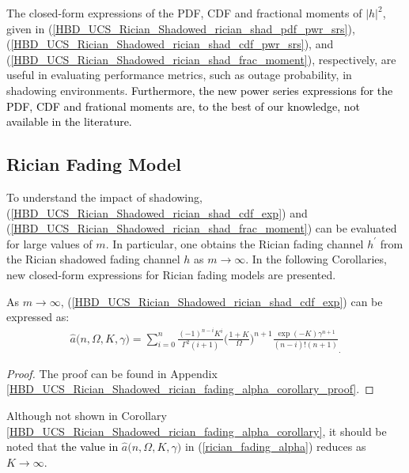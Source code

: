 The closed-form expressions of the PDF, CDF and fractional moments of $|h|^2$, given in (\ref{HBD_UCS_Rician_Shadowed_rician_shad_pdf_pwr_srs}), (\ref{HBD_UCS_Rician_Shadowed_rician_shad_cdf_pwr_srs}), and (\ref{HBD_UCS_Rician_Shadowed_rician_shad_frac_moment}), respectively, are useful in evaluating performance metrics, such as outage probability, in shadowing environments. \textcolor{black}{Furthermore, the new power series expressions for the PDF, CDF and frational moments are, to the best of our knowledge, not available in the literature.}

\subsection{Rician Fading Model}
To understand the impact of shadowing, (\ref{HBD_UCS_Rician_Shadowed_rician_shad_cdf_exp}) and (\ref{HBD_UCS_Rician_Shadowed_rician_shad_frac_moment}) can be evaluated for large values of $m$. In particular, one obtains the Rician fading channel $h^{'}$ from the Rician shadowed fading channel $h$ as $m \to \infty$. In the following Corollaries, new closed-form expressions for Rician fading models are presented.

\begin{corollary} \label{HBD_UCS_Rician_Shadowed_rician_fading_alpha_corollary}
As $m \to \infty$, (\ref{HBD_UCS_Rician_Shadowed_rician_shad_cdf_exp}) can be expressed as:
\begin{eqnarray} \label{rician_fading_alpha}
\widehat{a}\big(n,\Omega,K,\gamma\big) = \sum_{i=0}^n \frac{(-1)^{n-i} K^i}{\Gamma^2(i+1)} \bigg(\frac{1+K}{\Omega}\bigg)^{n+1} \frac{\exp(-K)\gamma^{n+1}}{(n-i)!(n+1)}_.
\end{eqnarray}
\end{corollary}
\begin{proof}
The proof can be found in Appendix \ref{HBD_UCS_Rician_Shadowed_rician_fading_alpha_corollary_proof}.
\end{proof}

\begin{remark}
Although not shown in Corollary \ref{HBD_UCS_Rician_Shadowed_rician_fading_alpha_corollary}, it should be noted that \textcolor{black}{the value in }$\widehat{a}\big(n,\Omega,K,\gamma\big)$ in (\ref{rician_fading_alpha}) reduces as $K \to \infty$.
\end{remark}

